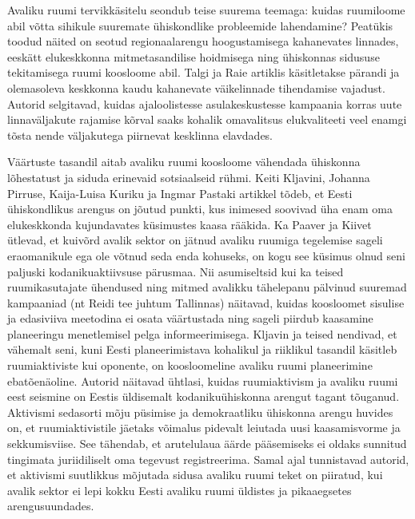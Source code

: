 \documentclass[estonian,]{article}
\begin{document}
Avaliku ruumi tervikkäsitelu seondub teise suurema teemaga: kuidas ruumiloome abil võtta sihikule suuremate ühiskondlike probleemide lahendamine? Peatükis toodud näited on seotud regionaalarengu hoogustamisega kahanevates linnades, eeskätt elukeskkonna mitmetasandilise hoidmisega ning ühiskonnas sidususe tekitamisega ruumi koosloome abil. Talgi ja Raie artiklis käsitletakse pärandi ja olemasoleva keskkonna kaudu kahanevate väikelinnade tihendamise vajadust. Autorid selgitavad, kuidas ajaloolistesse asulakeskustesse kampaania korras uute linnaväljakute rajamise kõrval saaks kohalik omavalitsus elukvaliteeti veel enamgi tõsta nende väljakutega piirnevat kesklinna elavdades.

Väärtuste tasandil aitab avaliku ruumi koosloome vähendada ühiskonna lõhestatust ja siduda erinevaid sotsiaalseid rühmi. Keiti Kljavini, Johanna Pirruse, Kaija-Luisa Kuriku ja Ingmar Pastaki artikkel tõdeb, et Eesti ühiskondlikus arengus on jõutud punkti, kus inimesed soovivad üha enam oma elukeskkonda kujundavates küsimustes kaasa rääkida. Ka Paaver ja Kiivet ütlevad, et kuivõrd avalik sektor on jätnud avaliku ruumiga tegelemise sageli eraomanikule ega ole võtnud seda enda kohuseks, on kogu see küsimus olnud seni paljuski kodanikuaktiivsuse pärusmaa. Nii asumiseltsid kui ka teised ruumikasutajate ühendused ning mitmed avalikku tähelepanu pälvinud suuremad kampaaniad (nt Reidi tee juhtum Tallinnas) näitavad, kuidas koosloomet sisulise ja edasiviiva meetodina ei osata väärtustada ning sageli piirdub kaasamine planeeringu menetlemisel pelga informeerimisega. Kljavin ja teised nendivad, et vähemalt seni, kuni Eesti planeerimistava kohalikul ja riiklikul tasandil käsitleb ruumiaktiviste kui oponente, on koosloomeline avaliku ruumi planeerimine ebatõenäoline. Autorid näitavad ühtlasi, kuidas ruumiaktivism ja avaliku ruumi eest seismine on Eestis üldisemalt kodanikuühiskonna arengut tagant tõuganud. Aktivismi sedasorti mõju püsimise ja demokraatliku ühiskonna arengu huvides on, et ruumiaktivistile jäetaks võimalus pidevalt leiutada uusi kaasamisvorme ja sekkumisviise. See tähendab, et arutelulaua äärde pääsemiseks ei oldaks sunnitud tingimata juriidiliselt oma tegevust registreerima. Samal ajal tunnistavad autorid, et aktivismi suutlikkus mõjutada sidusa avaliku ruumi teket on piiratud, kui avalik sektor ei lepi kokku Eesti avaliku ruumi üldistes ja pikaaegsetes arengusuundades.
\end{document}

